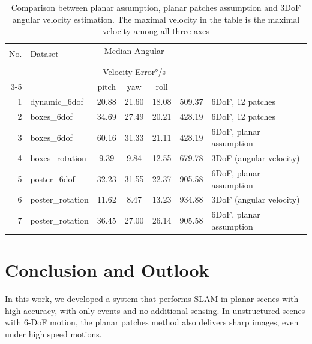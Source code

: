 \begin{table}[h]
  \begin{center}
    \begin{tabular}{rlccccl}
      \hline
      \multirow{3}{*}{No.}&\multirow{3}{*}{Dataset}&\multicolumn{3}{c}{Median Angular}&\multirowcell{3}{Maximal\\Velocity\\\si[per-mode=symbol]{\degree\per\second}}&\multirow{3}{*}{Parametrization}\\
                          &                     &\multicolumn{3}{c}{Velocity Error\si[per-mode=symbol]{\degree\per\second}}& &\\
      \cline{3-5}
                          &                    & pitch&  yaw & roll &          &                  \\
      \hline\hline
      1&dynamic\_6dof    & 20.88 & 21.60 & 18.08 & 509.37 & 6DoF, 12 patches \\
      2&boxes\_6dof      & 34.69 & 27.49 & 20.21 & 428.19 & 6DoF, 12 patches \\
      3&boxes\_6dof      & 60.16 & 31.33 & 21.11 & 428.19 & 6DoF, planar assumption \\
      4&boxes\_rotation  & 9.39 & 9.84 & 12.55 &679.78& 3DoF (angular velocity)\\
      5&poster\_6dof     & 32.23 & 31.55 & 22.37  & 905.58 & 6DoF, planar assumption\\
      6&poster\_rotation & 11.62 & 8.47  & 13.23  & 934.88 & 3DoF (angular velocity) \\
      7&poster\_rotation & 36.45 & 27.00 & 26.14 &905.58& 6DoF, planar assumption\\

      \hline
    \end{tabular}
  \end{center}
  \caption{Comparison between planar assumption, planar patches
    assumption and 3DoF angular velocity estimation. The maximal
    velocity in the table is the maximal velocity among all three
    axes}
  \label{tab:err_est_planar}
\end{table}

\label{sec:note}

\chapter{Conclusion and Outlook}
\label{chap:conclusion}
In this work, we developed a system that performs SLAM in planar
scenes with high accuracy, with only events and no additional
sensing. In unstructured scenes with 6-DoF motion, the planar patches
method also delivers sharp images, even under high speed motions.


